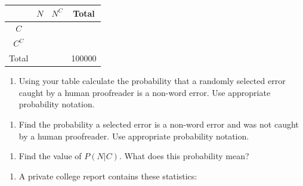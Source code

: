 \documentclass[
]{report}
\providecommand{\tightlist}{%
  \setlength{\itemsep}{0pt}\setlength{\parskip}{0pt}}
\begin{document}
\begin{center}
\begin{tabular}{|c|c|c|c|} \hline
\hspace{0.8in} & \hspace{0.25in}  $N$ \hspace{.25in} & \hspace{0.25in} $N^C$ \hspace{0.25in} & \hspace{0.25in} Total \hspace{0.25in} \\ \hline
 $C$ &  &  &  \\ \hline
 $C^C$ &  & &  \\ \hline
Total &  &  & 100000 \\ \hline
\end{tabular}
\end{center}
\vspace{.1in}

\begin{enumerate}
\def\labelenumi{\alph{enumi}.}
\setcounter{enumi}{2}
\tightlist
\item
  Using your table calculate the probability that a randomly selected error caught by a human proofreader is a non-word error. Use appropriate probability notation.
\end{enumerate}

\vspace{1in}

\begin{enumerate}
\def\labelenumi{\alph{enumi}.}
\setcounter{enumi}{3}
\tightlist
\item
  Find the probability a selected error is a non-word error and was not caught by a human proofreader. Use appropriate probability notation.
\end{enumerate}

\vspace{1in}

\begin{enumerate}
\def\labelenumi{\alph{enumi}.}
\setcounter{enumi}{4}
\tightlist
\item
  Find the value of \(P(N|C)\). What does this probability mean?
\end{enumerate}

\vspace{1in}

\newpage

\begin{enumerate}
\def\labelenumi{\arabic{enumi}.}
\setcounter{enumi}{1}
\tightlist
\item
  A private college report contains these statistics:
\end{enumerate}
\end{document}
